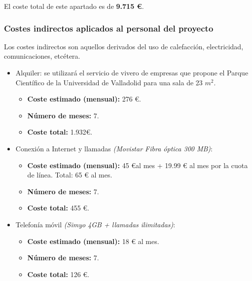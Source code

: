 \documentclass[twoside]{report}
\begin{document}
El coste total de este apartado es de \textbf{9.715 \euro}.

\subsubsection{Costes indirectos aplicados al personal del proyecto}

Los costes indirectos son aquellos derivados del uso de calefacción, electricidad, comunicaciones, etcétera.

\begin{itemize}

\item Alquiler: se utilizará el servicio de vivero de empresas que propone el Parque Científico de la Universidad de Valladolid \cite{pcuva} para una sala de 23 ${m}^{2}$.
	\begin{itemize}
		\item \textbf{Coste estimado (mensual): } 276 \euro.
		\item \textbf{Número de meses:} 7.
		\item \textbf{Coste total:} 1.932\euro.
	\end{itemize}
	
\item Conexión a Internet y llamadas \textit{(Movistar Fibra óptica 300 MB)}:
	\begin{itemize}
		\item \textbf{Coste estimado (mensual):} 45 \euro \hspace{0.1cm}al mes + 19.99 \euro \hspace{0.1cm} al mes por la cuota de línea. Total: 65 \euro \hspace{0.1cm} al mes.
		\item \textbf{Número de meses:} 7.
		\item \textbf{Coste total:} 455 \euro.
	\end{itemize}
		
\item Telefonía móvil \textit{(Simyo 4GB + llamadas ilimitadas)}:
	\begin{itemize}
		\item \textbf{Coste estimado (mensual):} 18 \euro \hspace{0.1cm} al mes.
		\item \textbf{Número de meses:} 7.
		\item \textbf{Coste total:} 126 \euro.
	\end{itemize}

\end{itemize}
\end{document}
